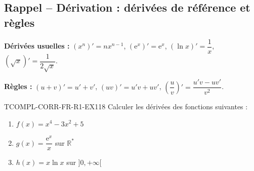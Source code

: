 

\subsection*{Rappel -- Dérivation : dérivées de référence et règles}

\textbf{Dérivées usuelles :} $(x^n)' = n x^{n-1}$, $(\mathrm{e}^x)' = \mathrm{e}^x$, $(\ln x)' = \dfrac{1}{x}$, $(\sqrt{x})' = \dfrac{1}{2\sqrt{x}}$.

\textbf{Règles :} $(u+v)' = u' + v'$, $(uv)' = u'v + uv'$, $\left(\dfrac{u}{v}\right)' = \dfrac{u'v - uv'}{v^2}$.

\begin{exercice}{TCOMPL-CORR-FR-R1-EX1}{1}{8}
Calculer les dérivées des fonctions suivantes :
\begin{enumerate}
  \item $f(x) = x^4 - 3x^2 + 5$
  \item $g(x) = \dfrac{\mathrm{e}^x}{x}$ sur $\mathbb{R}^*$
  \item $h(x) = x \ln x$ sur $]0, +\infty[$
\end{enumerate}
\end{exercice}

